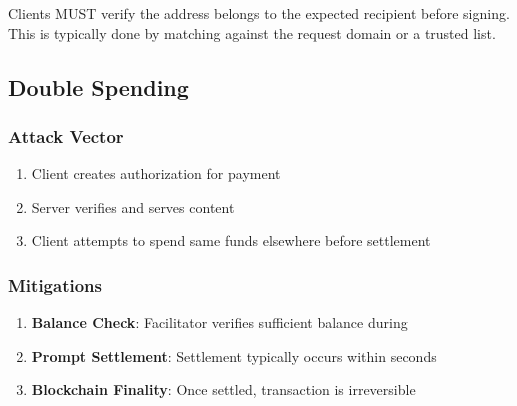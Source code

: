 \begin{warningbox}
Clients MUST verify the  address belongs to the expected recipient before signing. This is typically done by matching against the request domain or a trusted list.
\end{warningbox}

\subsection{Double Spending}

\subsubsection{Attack Vector}

\begin{enumerate}
    \item Client creates authorization for payment
    \item Server verifies and serves content
    \item Client attempts to spend same funds elsewhere before settlement
\end{enumerate}

\subsubsection{Mitigations}

\begin{enumerate}
    \item \textbf{Balance Check}: Facilitator verifies sufficient balance during 
    \item \textbf{Prompt Settlement}: Settlement typically occurs within seconds
    \item \textbf{Blockchain Finality}: Once settled, transaction is irreversible
\end{enumerate}


